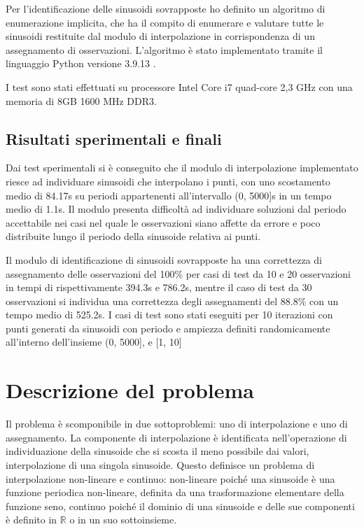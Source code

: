 \documentclass[a4paper,12pt]{report}
\begin{document}
Per l'identificazione delle sinusoidi sovrapposte ho definito un algoritmo di enumerazione implicita, che ha il compito di enumerare e valutare tutte le sinusoidi restituite dal modulo di interpolazione in corrispondenza di un assegnamento di osservazioni. L'algoritmo è stato implementato tramite il linguaggio Python versione 3.9.13 \cite{python}.

I test sono stati effettuati su processore Intel Core i7 quad-core 2,3 GHz con una memoria di 8GB 1600 MHz DDR3.

\section{Risultati sperimentali e finali}

Dai test sperimentali si è conseguito che il modulo di interpolazione implementato riesce ad individuare sinusoidi che interpolano i punti, con uno scostamento medio di 84.17s su periodi appartenenti all'intervallo (0, 5000]s in un tempo medio di 1.1s. Il modulo presenta difficoltà ad individuare soluzioni dal periodo accettabile nei casi nel quale le osservazioni siano affette da errore e poco distribuite lungo il periodo della sinusoide relativa ai punti.

Il modulo di identificazione di sinusoidi sovrapposte ha una correttezza di assegnamento delle osservazioni del 100\% per casi di test da 10 e 20 osservazioni in tempi di rispettivamente 394.3s e 786.2s, mentre il caso di test da 30 osservazioni si individua una correttezza degli assegnamenti del 88.8\% con un tempo medio di 525.2s. I casi di test sono stati eseguiti per 10 iterazioni con punti generati da sinusoidi con periodo e ampiezza definiti randomicamente all'interno dell'insieme (0, 5000], e [1, 10]


%
%
\chapter{Descrizione del problema}
\label{cap2}
Il problema è scomponibile in due sottoproblemi: uno di interpolazione e uno di assegnamento. La componente di interpolazione è identificata nell'operazione di individuazione della sinusoide che si scosta il meno possibile dai valori, interpolazione di una singola sinusoide. Questo definisce un problema di interpolazione non-lineare e continuo: non-lineare poiché una sinusoide è una funzione periodica non-lineare, definita da una trasformazione elementare della funzione seno, continuo poiché il dominio di una sinusoide e delle sue componenti è definito in $\mathbb{R}$ o in un suo sottoinsieme.
\end{document}
